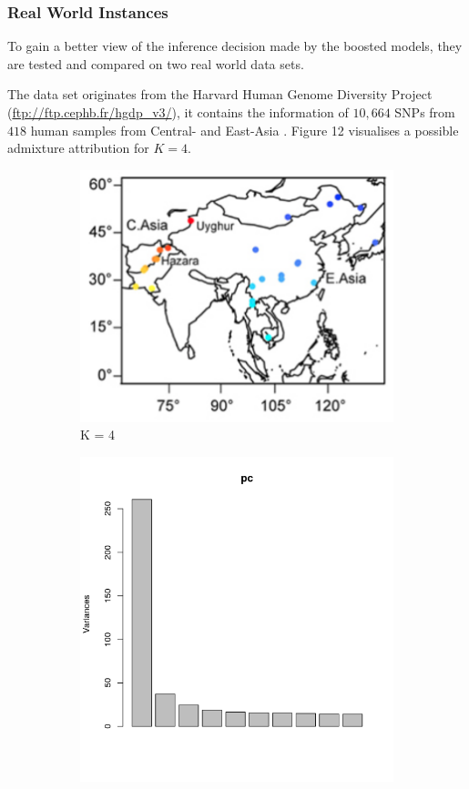 \documentclass[a4paper, 11pt]{article}
\begin{document}
\subsubsection{Real World Instances}
To gain a better view of the inference decision made by the boosted models, they are tested and compared on two real world data sets.

The data set originates from the Harvard Human Genome Diversity Project (\url{ftp://ftp.cephb.fr/hgdp_v3/}), it contains the information of $10,664$ SNPs from $418$ human samples from Central- and East-Asia \parencite{frichot2012correcting}. Figure 12 visualises a possible admixture attribution for $K = 4$.\\

\begin{figure}
\centering
\begin{subfigure}
\centering
\includegraphics[scale=0.35]{asia_pop}
\caption{K = 4}
\end{subfigure}
\begin{subfigure}
\centering
\includegraphics[scale=0.5]{pc_asia}

\end{subfigure}
\end{figure}
\end{document}
